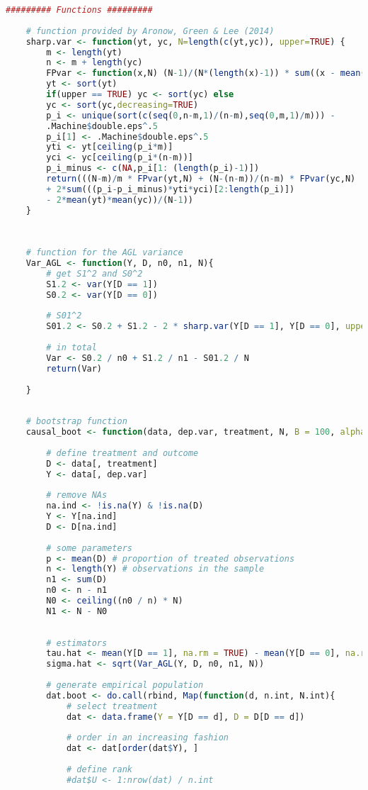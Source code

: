 \documentclass[aodsor,preprint]{imsart}
\numberwithin{equation}{section}
\theoremstyle{plain}
\begin{document}
\begin{lstlisting}[language=R, basicstyle=\tiny\tiny]
	######### Functions ######### 
		
	# function provided by Aronow, Green & Lee (2014)
	sharp.var <- function(yt, yc, N=length(c(yt,yc)), upper=TRUE) {
		m <- length(yt)
		n <- m + length(yc)
		FPvar <- function(x,N) (N-1)/(N*(length(x)-1)) * sum((x - mean(x))^2)
		yt <- sort(yt)
		if(upper == TRUE) yc <- sort(yc) else
		yc <- sort(yc,decreasing=TRUE)
		p_i <- unique(sort(c(seq(0,n-m,1)/(n-m),seq(0,m,1)/m))) -
		.Machine$double.eps^.5
		p_i[1] <- .Machine$double.eps^.5
		yti <- yt[ceiling(p_i*m)]
		yci <- yc[ceiling(p_i*(n-m))]
		p_i_minus <- c(NA,p_i[1: (length(p_i)-1)])
		return(((N-m)/m * FPvar(yt,N) + (N-(n-m))/(n-m) * FPvar(yc,N)
		+ 2*sum(((p_i-p_i_minus)*yti*yci)[2:length(p_i)])
		- 2*mean(yt)*mean(yc))/(N-1))
	}
	
	
	
	# function for the AGL variance
	Var_AGL <- function(Y, D, n0, n1, N){
		# get S1^2 and S0^2
		S1.2 <- var(Y[D == 1])
		S0.2 <- var(Y[D == 0])
		
		# S01^2
		S01.2 <- S0.2 + S1.2 - 2 * sharp.var(Y[D == 1], Y[D == 0], upper = TRUE)
		
		# in total
		Var <- S0.2 / n0 + S1.2 / n1 - S01.2 / N
		return(Var)
		
	}
	
	
	# bootstrap function
	causal_boot <- function(data, dep.var, treatment, N, B = 100, alpha = 0.05){
		
		# define treatment and outcome
		D <- data[, treatment]
		Y <- data[, dep.var]
		
		# remove NAs
		na.ind <- !is.na(Y) & !is.na(D)
		Y <- Y[na.ind]
		D <- D[na.ind]
		
		# some parameters
		p <- mean(D) # proportion of treated observations
		n <- length(Y) # observations in the sample
		n1 <- sum(D)
		n0 <- n - n1
		N0 <- ceiling((n0 / n) * N)
		N1 <- N - N0
		
		
		# estimators
		tau.hat <- mean(Y[D == 1], na.rm = TRUE) - mean(Y[D == 0], na.rm = TRUE)
		sigma.hat <- sqrt(Var_AGL(Y, D, n0, n1, N))
		
		# generate empirical population
		dat.boot <- do.call(rbind, Map(function(d, n.int, N.int){
			# select treatment
			dat <- data.frame(Y = Y[D == d], D = D[D == d])
			
			# order in an increasing fashion
			dat <- dat[order(dat$Y), ]
			
			# define rank
			#dat$U <- 1:nrow(dat) / n.int
			

\end{lstlisting}
\end{document}
